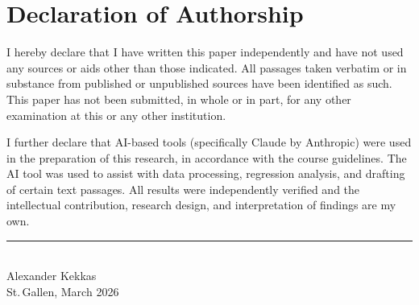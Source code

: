 \documentclass[12pt,a4paper]{article}
\begin{document}

\newpage
\section*{Declaration of Authorship}

I hereby declare that I have written this paper independently and have not used any sources or aids other than those indicated. All passages taken verbatim or in substance from published or unpublished sources have been identified as such. This paper has not been submitted, in whole or in part, for any other examination at this or any other institution.

I further declare that AI-based tools (specifically Claude by Anthropic) were used in the preparation of this research, in accordance with the course guidelines. The AI tool was used to assist with data processing, regression analysis, and drafting of certain text passages. All results were independently verified and the intellectual contribution, research design, and interpretation of findings are my own.

\vspace{2cm}

\noindent\rule{6cm}{0.4pt}\\
Alexander Kekkas\\
St.\,Gallen, March 2026
\end{document}
